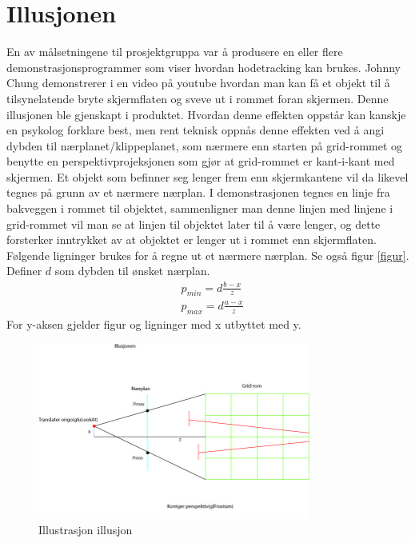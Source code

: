 \documentclass{report}
\begin{document}
\section{Illusjonen}
En av målsetningene til prosjektgruppa var å produsere en eller flere demonstrasjonsprogrammer
som viser hvordan hodetracking kan brukes. Johnny Chung demonstrerer i en video på youtube
hvordan man kan få et objekt til å tilsynelatende bryte skjermflaten og sveve ut i rommet foran skjermen.
Denne illusjonen ble gjenskapt i produktet. Hvordan denne effekten oppstår kan kanskje en psykolog forklare
best, men rent teknisk oppnås denne effekten ved å angi dybden til nærplanet/klippeplanet, som nærmere enn
starten på grid-rommet og benytte en perspektivprojeksjonen som gjør at grid-rommet er kant-i-kant med skjermen.
Et objekt som befinner seg lenger frem enn skjermkantene vil da likevel tegnes på grunn av et nærmere nærplan.
I demonstrasjonen tegnes en linje fra bakveggen i rommet til objektet, sammenligner man denne linjen med linjene
i grid-rommet vil man se at linjen til objektet later til å være lenger, og dette forsterker inntrykket av at
objektet er lenger ut i rommet enn skjermflaten. 
Følgende ligninger brukes for å regne ut et nærmere nærplan. Se også figur \ref{figur}.
Definer $d$ som dybden til ønsket nærplan.
\begin{eqnarray}
&p_{min} = d\frac{b-x}{z}\\
&p_{max} = d\frac{a-x}{z}
\end{eqnarray}
For y-aksen gjelder figur og ligninger med x utbyttet med y.

	\begin{figure}[h]
	\centering
	\includegraphics[width=0.80\textwidth]{graphics/Illusjonen.jpg}
	\caption{Illustrasjon illusjon}
	\label{fig:illusjon}
	\end{figure}
\end{document}
